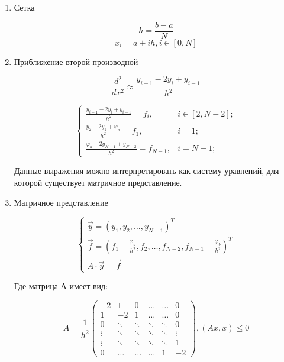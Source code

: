 \documentclass[10pt,a4paper]{article}
\begin{document}
	\begin{enumerate}
		\item Сетка
		
		\begin{equation}
			h = \frac{b - a}{N}
		\end{equation}
		\begin{equation}
			x_{i} = a + ih, i \in \left[0, N\right]
		\end{equation}
		\item Приближение второй производной
		
		\begin{equation}
			\frac{d^{2}}{dx^{2}} \approx \frac{y_{i + 1} - 2y_{i} + y_{i - 1}}
			{h^{2}}
		\end{equation}
		
		\begin{equation}
			\begin{cases}
				\frac{y_{i + 1} - 2y_{i} + y_{i - 1}}{h^{2}} = f_{i}, &i \in 
				\left[2, N - 2\right];
				\\
				\frac{y_{2} - 2y_{1} + \varphi_{a}}{h^{2}} = f_{1}, &i = 1;
				\\
				\frac{\varphi_{b} - 2y_{N - 1} + y_{N - 2}}{h^{2}} = f_{N - 1},
				&i = N - 1;
			\end{cases}
		\end{equation}
		
		Данные выражения можно интерпретировать как систему уравнений, для 
		которой существует матричное представление.
		
		\item Матричное представление
		
		\begin{equation}
			\begin{cases}
				\vec{y} = \left(y_{1},y_{2}, \ldots, y_{N - 1}\right)^{T}
				\\
				\vec{f} = \left(f_{1} - \frac{\varphi_{a}}{h^{2}},f_{2}, \ldots, 
				f_{N - 2}, f_{N - 1} - \frac{\varphi_{b}}{h^{2}}\right)^{T}
				\\
				A\cdot\vec{y} = \vec{f}
			\end{cases}
		\end{equation}
		
		Где матрица $А$ имеет вид:
		
		\begin{equation}
			A = \frac{1}{h^{2}}\begin{pmatrix}
				-2 & 1 & 0 & \ldots & \ldots &0 \\
				1 & -2 & 1 & \ldots & \ldots & 0 \\
				0& \ddots & \ddots &\ddots & \ddots & 0\\
				\vdots & \ddots & \ddots &\ddots & \ddots & \vdots\\
				\vdots & \ddots & \ddots &\ddots & \ddots & 1\\
				0 & \ldots & \ldots & \ldots & 1 & -2 
			\end{pmatrix}, \left(Ax, x\right) \leqslant 0
		\end{equation}
		

\end{enumerate}
\end{document}
